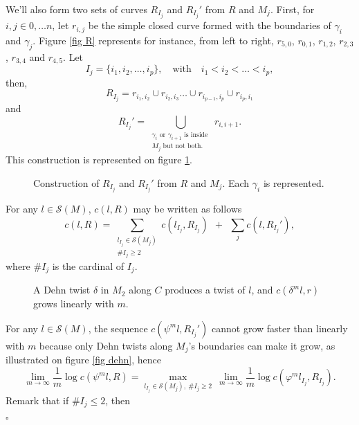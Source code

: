 \documentclass[a4paper, 11pt, leqno]{article}
\newcommand{\s}{\mathscr S}
\newcommand{\card}{\#}
\newcounter{ex}[section]
\newenvironment{dem}{\noindent {\it Proof. }} %
{$\square$ \par \vspace{0.2cm}}
\begin{document}
\begin{dem}
  We'll also form two sets of curves $R_{I_j}$ and $R_{I_j}'$ from $R$
  and $M_j$. First, for $i,j \in {0, \ldots n}$, let $r_{i,j}$ be
  the simple closed curve formed with the boundaries of $\gamma_i$ and
  $\gamma_j$. Figure \ref{fig R} represents for instance, from left to
  right, $r_{5,0}$, $r_{0,1}$, $r_{1,2}$, $r_{2,3}$, $r_{3,4}$ and
  $r_{4,5}$. Let 
  $$
  I_j = \{ i_1, i_2, \ldots, i_p \}, \quad \text{with} \quad i_1 < i_2 < \ldots
  < i_p,
  $$
  then, 
  $$
  R_{I_j} = r_{i_1,i_2} \cup r_{i_2,i_3} \ldots \cup r_{i_{p-1},i_p}
  \cup r_{i_p,i_1} 
  $$
  and
  $$
  R_{I_j}' = \bigcup_{
    \begin{array}{l}
      \gamma_i \text{ or } \gamma_{i+1} \text{ is inside }\\
      M_j \text{ but not both.}
    \end{array}
  } 
  r_{i, i+1}.
  $$
  This construction is represented on figure \ref{fig rij}.
  \begin{figure}[hbt!]
    \begin{center}
      
      \caption{\label{fig rij} Construction of $R_{I_j}$ and $R_{I_j}'$
	from $R$ and $M_j$. Each $\gamma_i$ is represented.}
    \end{center}
  \end{figure}
  For any $l \in \s(M)$, $c(l, R)$ may be written as follows
  $$
  c(l, R) = \sum_{
    \begin{array}{l}
      l_{I_j} \in \s(M_j) \\ 
      \card I_j \ge 2
  \end{array}}
  c(l_{I_j}, R_{I_j})
  \ \ + \ \
  \sum_j c(l, R_{I_j}'),
  $$
  where $\card I_j$ is the cardinal of $I_j$.
  \begin{figure}[hbt!]
    \begin{center}
      
      \caption{\label{fig dehn}A Dehn twist $\delta$ in $M_2$ along $C$ 
	produces a twist of $l$, and $c(\delta^m l, r)$ grows linearly with $m$.}
    \end{center}
  \end{figure}
  For any $l \in \s(M)$, the sequence $c(\psi^m l, R_{I_j}')$ cannot
  grow faster than linearly with $m$ because only Dehn twists along
  $M_j$'s boundaries can make it grow, as illustrated on figure \ref{fig
    dehn}, hence
  $$
  \lim_{m\rightarrow \infty} \frac{1}{m} \log c(\psi^m l, R) = 
  \max_{l_{I_j} \in \s(M_j),\ \card I_j \ge 2} 
  \ 
  \lim_{m\rightarrow \infty} \frac{1}{m} \log c(\varphi^m l_{I_j}, R_{I_j}). 
  $$
  Remark that if $\card {I_j}\le 2$, then 

\end{dem}
\end{document}

